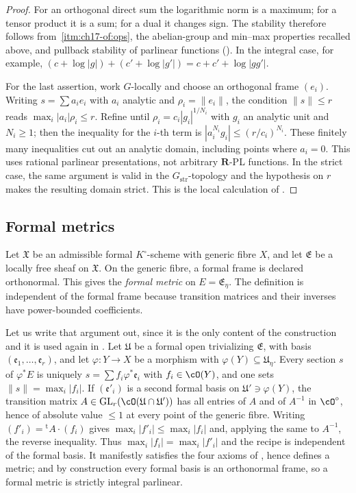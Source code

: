 \begin{proof}
For an orthogonal direct sum the logarithmic norm is a maximum; for a tensor
product it is a sum; for a dual it changes sign.  The stability therefore
follows from
\,\cref{itm:ch17-of:ops}, the abelian-group
and min--max properties recalled above, and pullback stability of parlinear
functions ().  In the integral case, for
example,
$(c+\log|g|)+(c'+\log|g'|)=c+c'+\log|gg'|$.

For the last assertion, work $G$-locally and choose an orthogonal frame
$(e_i)$.  Writing $s=\sum a_ie_i$ with $a_i$ analytic and
$\rho_i=\|e_i\|$, the condition $\|s\|\le r$ reads
$\max_i|a_i|\rho_i\le r$.  Refine until
$\rho_i=c_i|g_i|^{1/N_i}$ with $g_i$ an analytic unit and $N_i\ge1$;
then the inequality for the $i$-th term is
$|a_i^{N_i}g_i|\le(r/c_i)^{N_i}$.  These finitely many inequalities
cut out an analytic domain, including points where $a_i=0$.
This uses rational parlinear presentations, not arbitrary
$\mathbf R$-PL functions.  In the strict case, the same argument is valid in the
$G_{\mathrm{str}}$-topology and the hypothesis on $r$ makes the resulting
domain strict.  This is the local calculation of
\cite[\S17.2.9]{CLD25}.
\end{proof}

\subsection{Formal metrics}
\label{sec:ch17-formal-metrics}

Let $\mathfrak X$ be an admissible formal $K^\circ$-scheme with generic
fibre $X$, and let $\mathfrak E$ be a locally free sheaf on
$\mathfrak X$.  On the generic fibre, a formal frame is declared
orthonormal.  This gives the \emph{formal metric} on $E=\mathfrak E_\eta$.
The definition is independent of the formal frame because transition
matrices and their inverses have power-bounded coefficients.

Let us write that argument out, since it is the only content of the
construction and it is used again in .  Let
$\mathfrak U$ be a formal open trivializing $\mathfrak E$, with basis
$(\mathfrak e_1,\dots,\mathfrak e_r)$, and let $\varphi:Y\to X$ be a
morphism with $\varphi(Y)\subseteq\mathfrak U_\eta$.  Every section $s$
of $\varphi^*E$ is uniquely $s=\sum f_i\varphi^*\mathfrak e_i$ with
$f_i\in\cO(Y)$, and one sets
$\|s\|=\max_i|f_i|$.  If $(\mathfrak e'_i)$ is a second formal basis on
$\mathfrak U'\ni\varphi(Y)$, the transition matrix
$A\in\mathrm{GL}_r(\cO(\mathfrak U\cap\mathfrak U'))$ has all entries of
$A$ and of $A^{-1}$ in $\cO^\circ$, hence of absolute value $\le1$
at every point of the generic fibre.  Writing $(f'_i)={}^{\mathrm t}\!A\cdot(f_i)$
gives $\max_i|f'_i|\le\max_i|f_i|$ and, applying the same to $A^{-1}$,
the reverse inequality.  Thus $\max_i|f_i|=\max_i|f'_i|$ and the recipe is
independent of the formal basis.  It manifestly satisfies the four axioms of
\cite[Remark~17.1.5]{CLD25}, hence defines a metric; and by construction
every formal basis is an orthonormal frame, so a formal metric is strictly
integral parlinear.

